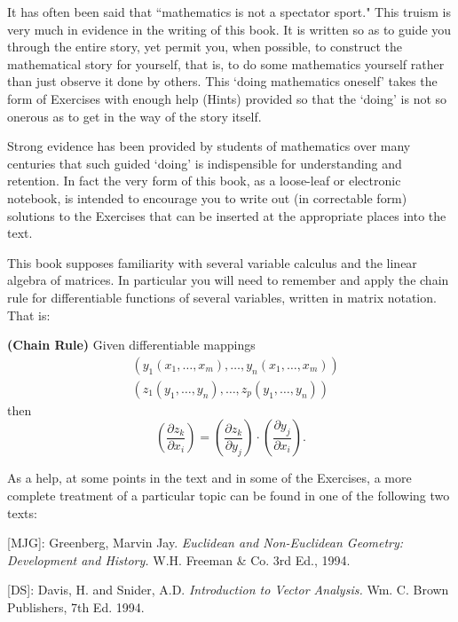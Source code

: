 It has often been said that \textquotedblleft mathematics is not a spectator
sport." This truism is very much in evidence in the writing of this book. It
is written so as to guide you through the entire story, yet permit you, when
possible, to construct the mathematical story for yourself, that is, to do
some mathematics yourself rather than just observe it done by others. This
`doing mathematics oneself' takes the form of Exercises with enough help
(Hints) provided so that the `doing' is not so onerous as to get in the way of
the story itself.

Strong evidence has been provided by students of mathematics over many
centuries that such guided `doing' is indispensible for understanding and
retention. In fact the very form of this book, as a loose-leaf or electronic
notebook, is intended to encourage you to write out (in correctable form)
solutions to the Exercises that can be inserted at the appropriate places into
the text.

This book supposes familiarity with several variable calculus and the linear
algebra of matrices. In particular you will need to remember and apply the
chain rule for differentiable functions of several variables, written in
matrix notation. That is:

\begin{theorem}
\textbf{(Chain Rule)} Given differentiable mappings%
\begin{align*}
&  \left(  y_{1}\left(  x_{1},\ldots,x_{m}\right)  ,\ldots,y_{n}\left(
x_{1},\ldots,x_{m}\right)  \right) \\
&  \left(  z_{1}\left(  y_{1},\ldots,y_{n}\right)  ,\ldots,z_{p}\left(
y_{1},\ldots,y_{n}\right)  \right)
\end{align*}
then%
\[
\left(  \frac{\partial z_{k}}{\partial x_{i}}\right)  =\left(  \frac{\partial
z_{k}}{\partial y_{j}}\right)  \cdot\left(  \frac{\partial y_{j}}{\partial
x_{i}}\right)  .
\]

\end{theorem}

As a help, at some points in the text and in some of the Exercises, a more
complete treatment of a particular topic can be found in one of the following
two texts:

[MJG]: Greenberg, Marvin Jay. \textit{Euclidean and Non-Euclidean Geometry:
Development and History.} W.H. Freeman \& Co. 3rd Ed., 1994.

[DS]: Davis, H. and Snider, A.D. \textit{Introduction to Vector Analysis.} Wm.
C. Brown Publishers, 7th Ed. 1994.

